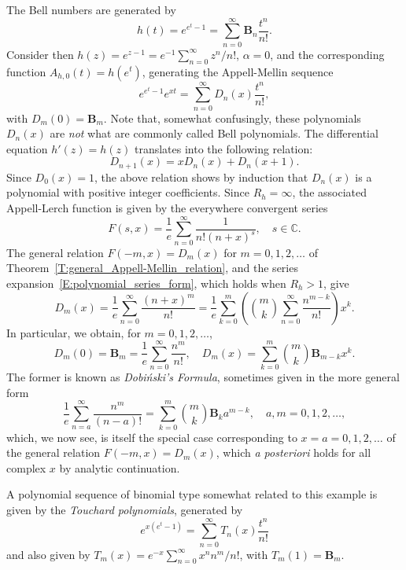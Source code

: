 \documentclass[11pt,a4paper]{amsart}
\newcommand{\C}{\mathbb{C}}
\newcommand{\bell}{\mathbf{B}}
\theoremstyle{plain}
\theoremstyle{plain}
\theoremstyle{definition}
\theoremstyle{remark}
\begin{document}
The Bell numbers are generated by
\[
 	h(t) = e^{e^t-1} = \sum_{n=0}^{\infty} \bell_{n} \frac{t^n}{n!}.
\]
Consider then $h(z) = e^{z-1} = e^{-1} \sum_{n=0}^{\infty} z^n/n!$, $\alpha = 0$, and the corresponding function $A_{h,0}(t) = h(e^{t})$, generating the Appell-Mellin sequence
% 
\begin{equation*}
	  e^{e^t - 1}e^{xt}
	= \sum_{n=0}^\infty D_{n}(x)\frac{t^n}{n!},
\end{equation*}
% 
with $D_{m}(0) = \bell_{m}$. Note that, somewhat confusingly, these polynomials $D_{n}(x)$ are \emph{not} what are commonly called Bell polynomials. The differential equation $h'(z) = h(z)$ translates into the following relation:
\[
	D_{n+1}(x) = x D_{n}(x) + D_{n}(x+1).
\]
Since $D_{0}(x) = 1$, the above relation shows by induction that $D_{n}(x)$ is a polynomial with positive integer coefficients. Since $R_{h} = \infty$, the associated Appell-Lerch function is given by the everywhere convergent series
\[
  F(s,x) = \frac{1}{e} \sum_{n=0}^\infty \frac{1}{n!(n + x)^{s}},\quad s \in \C.
\]
The general relation $F(-m,x) = D_{m}(x)$ for $m=0,1,2,\dots$ of Theorem~\ref{T:general_Appell-Mellin_relation}, and the series expansion~\eqref{E:polynomial_series_form}, which holds when $R_{h} > 1$, give
\[
	  D_m(x)
	= \frac{1}{e} \sum_{n=0}^{\infty} \frac{(n+x)^{m}}{n!}
	= \frac{1}{e} \sum_{k=0}^m \left(\binom{m}{k}\sum_{n=0}^\infty\frac{n^{m-k}}{n!}\right) x^k.
\]
In particular, we obtain, for $m=0,1,2,\dots$,
\[
	D_{m}(0) = \bell_{m}
	         = \frac{1}{e} \sum_{n=0}^{\infty} \frac{n^{m}}{n!},
	\quad
	D_{m}(x) = \sum_{k=0}^{m} \binom{m}{k} \bell_{m-k} x^{k}.
\]
The former is known as \emph{Dobi\'{n}ski's Formula}, sometimes given in the more general form
\[
	  \frac{1}{e} \sum_{n=a}^{\infty} \frac{n^{m}}{(n-a)!} 
	= \sum_{k=0}^{m} \binom{m}{k} \bell_{k} a^{m-k},
	\quad
	a,m = 0,1,2,\dots,
\]
which, we now see, is itself the special case corresponding to $x = a = 0,1,2,\dots$ of the general relation $F(-m,x) = D_{m}(x)$, which \emph{a posteriori} holds for all complex $x$ by analytic continuation.

A polynomial sequence of binomial type somewhat related to this example is given by the \emph{Touchard polynomials}, generated by
\[
	e^{x(e^{t}-1)} = \sum_{n=0}^{\infty} T_{n}(x) \frac{t^{n}}{n!}
\]
and also given by $T_{m}(x) = e^{-x} \sum_{n=0}^{\infty} x^{n} n^{m}/n!$, with $T_{m}(1) = \bell_{m}$.




\end{document}
